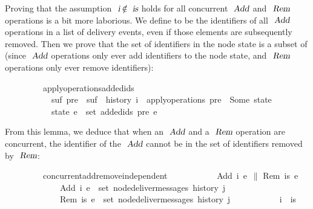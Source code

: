 Proving that the assumption $\isa{i} \mathbin{\isasymnotin} \isa{is}$ holds for all concurrent $\isa{Add}$ and $\isa{Rem}$ operations is a bit more laborious.
We define  to be the identifiers of all $\isa{Add}$ operations in a list of delivery events, even if those elements are subsequently removed.
Then we prove that the set of identifiers in the node state is a subset of  (since $\isa{Add}$ operations only ever add identifiers to the node state, and $\isa{Rem}$ operations only ever remove identifiers):
\vspace{0.275em}
\begin{isabellebody}
\ \ \ \ \ \ \ \ \ apply{\isacharunderscore}operations{\isacharunderscore}added{\isacharunderscore}ids{\isacharcolon}\isanewline
\ \ \ \ \ \ \ \ \ \ \ {\isachardoublequoteopen}{\isasymexists}suf{\isachardot}\ pre\ {\isacharat}\ suf\ {\isacharequal}\ history\ i{\isachardoublequoteclose}\ \ {\isachardoublequoteopen}apply{\isacharunderscore}operations\ pre\ {\isacharequal}\ Some\ state{\isachardoublequoteclose}\isanewline
\ \ \ \ \ \ \ \ \ \ \ {\isachardoublequoteopen}state\ e\ {\isasymsubseteq}\ set\ {\isacharparenleft}added{\isacharunderscore}ids\ pre\ e{\isacharparenright}{\isachardoublequoteclose}
\end{isabellebody}
\vspace{0.275em}
\noindent From this lemma, we deduce that when an $\isa{Add}$ and a $\isa{Rem}$ operation are concurrent, the identifier of the $\isa{Add}$ cannot be in the set of identifiers removed by $\isa{Rem}$:
\vspace{0.275em}
\begin{isabellebody}
\ \ \ \ \ \ \ \ \ concurrent{\isacharunderscore}add{\isacharunderscore}remove{\isacharunderscore}independent{\isacharcolon}\isanewline
\ \ \ \ \ \ \ \ \ \ \ {\isachardoublequoteopen}{\isacharparenleft}Add\ i\ e{}{\isacharparenright}\ $\|$ {\isacharparenleft}Rem\ is\ e{}{\isacharparenright}{\isachardoublequoteclose}\ \ \isanewline
\ \ \ \ \ \ \ \ \ \ \ \ \ {\isachardoublequoteopen}Add\ i\ e{}\ {\isasymin}\ set\ {\isacharparenleft}node{\isacharunderscore}deliver{\isacharunderscore}messages\ {\isacharparenleft}history\ j{\isacharparenright}{\isacharparenright}{\isachardoublequoteclose}\isanewline
\ \ \ \ \ \ \ \ \ \ \ \ \ {\isachardoublequoteopen}Rem\ is\ e{}\ {\isasymin}\ set\ {\isacharparenleft}node{\isacharunderscore}deliver{\isacharunderscore}messages\ {\isacharparenleft}history\ j{\isacharparenright}{\isacharparenright}{\isachardoublequoteclose}\isanewline
\ \ \ \ \ \ \ \ \ \ \ {\isachardoublequoteopen}i\ {\isasymnotin}\ is{\isachardoublequoteclose}
\end{isabellebody}
